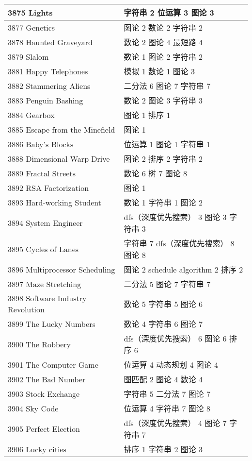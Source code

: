 \begin{longtable}{| p{} | p{} |}
 3875 Lights  & 字符串 2 位运算 3 图论 3 \\ \hline
 3877 Genetics  & 图论 2 数论 2 字符串 2 \\ \hline
 3878 Haunted Graveyard  & 数论 2 图论 4 最短路 4 \\ \hline
 3879 Slalom  & 数论 1 图论 2 字符串 2 \\ \hline
 3881 Happy Telephones  & 模拟 1 数论 1 图论 3 \\ \hline
 3882 Stammering Aliens  & 二分法 6 图论 7 字符串 7 \\ \hline
 3883 Penguin Bashing  & 数论 2 图论 3 字符串 3 \\ \hline
 3884 Gearbox  & 图论 1 排序 1 \\ \hline
 3885 Escape from the Minefield  & 图论 1 \\ \hline
 3886 Baby's Blocks  & 位运算 1 图论 1 字符串 1 \\ \hline
 3888 Dimensional Warp Drive  & 图论 2 排序 2 字符串 2 \\ \hline
 3889 Fractal Streets  & 数论 6 树 7 图论 8 \\ \hline
 3892 RSA Factorization  & 图论 1 \\ \hline
 3893 Hard-working Student  & 数论 1 字符串 1 图论 2 \\ \hline
 3894 System Engineer  & dfs（深度优先搜索） 3 图论 3 字符串 3 \\ \hline
 3895 Cycles of Lanes  & 字符串 7 dfs（深度优先搜索） 8 图论 8 \\ \hline
 3896 Multiprocessor Scheduling  & 图论 2 schedule algorithm 2 排序 2 \\ \hline
 3897 Maze Stretching  & 二分法 5 图论 7 字符串 7 \\ \hline
 3898 Software Industry Revolution  & 数论 5 字符串 5 图论 6 \\ \hline
 3899 The Lucky Numbers  & 数论 4 字符串 6 图论 7 \\ \hline
 3900 The Robbery  & dfs（深度优先搜索） 6 图论 6 排序 6 \\ \hline
 3901 The Computer Game  & 位运算 4 动态规划 4 图论 4 \\ \hline
 3902 The Bad Number  & 图匹配 2 图论 4 数论 4 \\ \hline
 3903 Stock Exchange  & 字符串 5 二分法 7 图论 7 \\ \hline
 3904 Sky Code  & 位运算 4 字符串 7 图论 8 \\ \hline
 3905 Perfect Election  & dfs（深度优先搜索） 4 图论 7 字符串 7 \\ \hline
 3906 Lucky cities  & 排序 1 字符串 2 图论 3 \\ \hline

\end{longtable}
